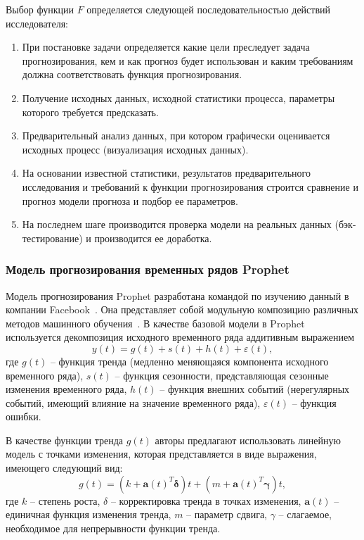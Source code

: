 Выбор функции $F$ определяется следующей последовательностью действий исследователя:
\begin{enumerate}
    \item При постановке задачи определяется какие цели преследует задача прогнозирования, кем и как прогноз будет 
    использован и каким требованиям должна соответствовать функция прогнозирования.
    \item Получение исходных данных, исходной статистики процесса, параметры которого требуется предсказать.
    \item Предварительный анализ данных, при котором графически оценивается исходных процесс (визуализация исходных 
    данных).
    \item На основании известной статистики, результатов предварительного исследования и требований к функции
    прогнозирования строится сравнение и прогноз модели прогноза и подбор ее параметров.
    \item На последнем шаге производится проверка модели на реальных данных (бэк-тестирование) и производится ее
    доработка.
\end{enumerate}

\subsubsection{Модель прогнозирования временных рядов Prophet}

Модель прогнозирования Prophet разработана командой по изучению данный в компании Facebook~\autocite{ml:prophet}. 
Она представляет собой модульную композицию различных методов машинного обучения~\autocite{ml:modularmodel}. В качестве базовой модели в Prophet используется декомпозиция исходного временного ряда
аддитивным выражением~\autocite{ml:tsrmodel} 
\begin{equation}
    y(t) = g(t) + s(t) + h(t) + \varepsilon(t),
\end{equation}
где $g(t)$ -- функция тренда (медленно меняющаяся компонента исходного временного ряда), $s(t)$ -- функция сезонности,
представляющая сезонные изменения временного ряда, $h(t)$ -- функция внешних событий (нерегулярных событий, имеющий влияние
на значение временного ряда), $\varepsilon(t)$ -- функция ошибки.

В качестве функции тренда $g(t)$ авторы предлагают использовать линейную модель с точками изменения, которая 
представляется в виде выражения, имеющего следующий вид:
\begin{equation}
    g(t) = \left( k + \mathbf{a}(t)^T \mathbf{\delta} \right)t + \left( m + \mathbf{a}(t)^T \mathbf{\gamma} \right)t,
\end{equation}
где $k$ -- степень роста, $\delta$ -- корректировка тренда в точках изменения, $\mathbf{a}(t)$ -- единичная функция 
изменения тренда, $m$ -- параметр сдвига, $\gamma$ -- слагаемое, необходимое для непрерывности функции тренда.

